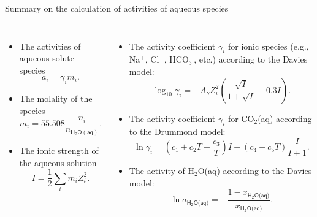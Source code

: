 \begin{frame}[shrink=10]{Summary on the calculation of activities of aqueous species}
	\begin{columns}[t]
		
		\begin{itemize}[<+->]
			\item  The \alert{activities} of aqueous solute species 
			\[
			a_{i}=\gamma_{i}m_{i}.
			\]
			\item The \alert{molality} of the species 
			\[
			m_{i}=55.508\frac{n_{i}}{n_{\mathsf{H_{2}O(aq)}}}.
			\]
			\item The \alert{ionic strength} of the aqueous solution 
			\[
			I=\frac{1}{2}\sum_{i}m_{i}Z_{i}^{2}.
			\]
		\end{itemize}
		
		\begin{itemize}[<+->]
			\item  The \alert{activity coefficient} $\gamma_{i}$  for  \alert{ionic species}
			(e.g., Na$^{+}$, Cl$^{-}$, HCO$_{3}^{-}$, etc.) according to the Davies model:
			\[
			\log_{10}\gamma_{i}=-A_{\gamma}Z_{i}^{2}\left(\dfrac{\sqrt{I}}{1+\sqrt{I}}-0.3I\right).
			\]
			\item The \alert{activity coefficient} $\gamma_{i}$ for  \alert{CO$_{2}$(aq)} according to the Drummond model:
			\[
			\ln\gamma_{i}=\left(c_{1}+c_{2}T+\frac{c_{3}}{T}\right)I-(c_{4}+c_{5}T)\frac{I}{I+1}.
			\]
			\item The \alert{activity of H$_{2}$O(aq)} according to the Davies model:
			\[
			\ln a_{\mathsf{H_{2}O\text{(aq)}}}=-\frac{1-x_{\mathsf{\mathsf{H_{2}O\text{(aq)}}}}}{x_{\mathsf{\mathsf{H_{2}O\text{(aq)}}}}}.
			\]
		\end{itemize}
	\end{columns}
	
\end{frame}
%
%
